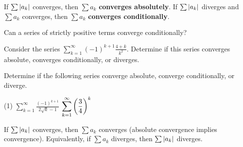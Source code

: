\documentclass[../mathNotesPreamble]{subfiles}
\begin{document}
  \begin{defn*}
    If $\sum{\left\vert a_k\right\vert}$ converges, then $\sum a_k$ \textbf{converges absolutely}.\newline
    If $\sum{\left\vert a_k\right\vert}$ diverges and $\sum a_k$ converges, then $\sum a_k$ \textbf{converges conditionally}.
  \end{defn*}
  \begin{ex*}
    Can a series of strictly positive terms converge conditionally?
  \end{ex*}
  \begin{ex*}
    Consider the series $\displaystyle\sum_{k=1}^\infty (-1)^{k+1}\frac{4+k}{k^2}$. Determine if this series converges absolute, converges conditionally, or diverges.
  \end{ex*}
  \pagebreak

  \begin{ex*}
    Determine if the following series converge absolute, converge conditionally, or diverge.
  \end{ex*}
  \begin{tasks}[after-item-skip=\stretch{1}, label=,item-indent=0pt](1)
    \task $\displaystyle\sum_{k=1}^\infty \frac{(-1)^{k+1}}{2\sqrt{k}-1}$
    \task $\displaystyle\sum_{k=1}^\infty {\left(\frac{3}{4}\right)}^k$
  \end{tasks}

  \begin{thmBox*}
    If $\sum {\left\vert a_k\right\vert}$ converges, then $\sum a_k$ converges (absolute convergence implies convergence). Equivalently, if $\sum a_k$ diverges, then $\sum{\left\vert a_k\right\vert}$ diverges.
  \end{thmBox*}
  \pagebreak
\end{document}
